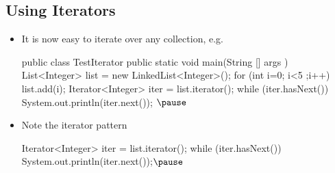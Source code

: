 
\begin{slide}
\section[-2]{Using Iterators}

\begin{PauseHighLight}
  \begin{itemize}
  \item It is now easy to iterate over any collection, e.g.
    \begin{java}
public class TestIterator
{
    public static void main(String [] args )
    {
        List<Integer> list = new LinkedList<Integer>();
        for (int i=0; i<5 ;i++)
            list.add(i);
        Iterator<Integer> iter = list.iterator();
        while (iter.hasNext())
            System.out.println(iter.next());
    }
}$\pause$
    \end{java}\vspace{-1.5cm}
  \item Note the iterator pattern
    \begin{java}
        Iterator<Integer> iter = list.iterator();
        while (iter.hasNext())
            System.out.println(iter.next());$\pause$
    \end{java}\vspace{-1.5cm}
  \end{itemize}
\end{PauseHighLight}
\end{slide}


